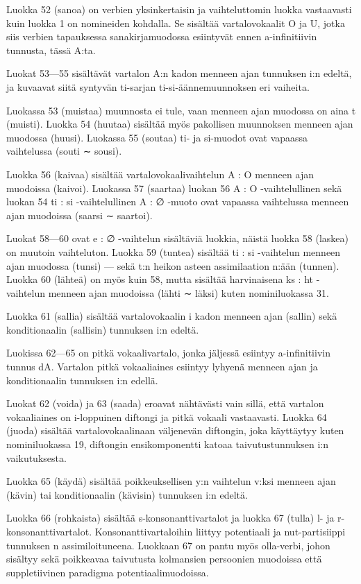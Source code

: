 \documentclass[free]{flammie}
\begin{document}
Luokka 52 (sanoa) on verbien yksinkertaisin ja vaihteluttomin luokka vastaavasti
kuin luokka 1 on nomineiden kohdalla. Se sisältää vartalovokaalit O ja U, jotka
siis verbien tapauksessa sanakirjamuodossa esiintyvät ennen a-infinitiivin tunnusta, tässä A:ta.

Luokat 53—55 sisältävät vartalon A:n kadon menneen ajan tunnuksen i:n edeltä,
ja kuvaavat siitä syntyvän ti-sarjan ti-si-äännemuunnoksen eri vaiheita.

Luokassa 53 (muistaa) muunnosta ei tule, vaan menneen ajan muodossa on aina
t (muisti). Luokka 54 (huutaa) sisältää myös pakollisen muunnoksen menneen
ajan muodossa (huusi). Luokassa 55 (soutaa) ti- ja si-muodot ovat vapaassa vaihtelussa (souti ∼ sousi).

Luokka 56 (kaivaa) sisältää vartalovokaalivaihtelun A : O menneen ajan muodoissa (kaivoi). Luokassa 57 (saartaa) luokan 56 A : O -vaihtelullinen sekä luokan 54 ti : si -vaihtelullinen A : ∅ -muoto ovat vapaassa vaihtelussa menneen ajan
muodoissa (saarsi ∼ saartoi).

Luokat 58—60 ovat e : ∅ -vaihtelun sisältäviä luokkia, näistä luokka 58 (laskea) on muutoin vaihteluton. Luokka 59 (tuntea) sisältää ti : si -vaihtelun menneen ajan muodossa (tunsi) — sekä t:n heikon asteen assimilaation n:ään (tunnen). Luokka 60 (lähteä) on myös kuin 58, mutta sisältää harvinaisena ks : ht
-vaihtelun menneen ajan muodoissa (lähti ∼ läksi) kuten nominiluokassa 31.

Luokka 61 (sallia) sisältää vartalovokaalin i kadon menneen ajan (sallin) sekä
konditionaalin (sallisin) tunnuksen i:n edeltä.

Luokissa 62—65 on pitkä vokaalivartalo, jonka jäljessä esiintyy a-infinitiivin tunnus dA. Vartalon pitkä vokaaliaines esiintyy lyhyenä menneen ajan ja konditionaalin tunnuksen i:n edellä.

Luokat 62 (voida) ja 63 (saada) eroavat nähtävästi vain sillä, että vartalon vokaaliaines on i-loppuinen diftongi ja pitkä vokaali vastaavasti. Luokka 64 (juoda) sisältää vartalovokaalinaan väljenevän diftongin, joka käyttäytyy kuten nominiluokassa 19, diftongin ensikomponentti katoaa taivutustunnuksen i:n vaikutuksesta.

Luokka 65 (käydä) sisältää poikkeuksellisen y:n vaihtelun v:ksi menneen ajan
(kävin) tai konditionaalin (kävisin) tunnuksen i:n edeltä.

Luokka 66 (rohkaista) sisältää s-konsonanttivartalot ja luokka 67 (tulla) l- ja
r-konsonanttivartalot. Konsonanttivartaloihin liittyy potentiaali ja nut-partisiippi
tunnuksen n assimiloituneena. Luokkaan 67 on pantu myös olla-verbi, johon sisältyy sekä poikkeavaa taivutusta kolmansien persoonien muodoissa että suppletiivinen paradigma potentiaalimuodoissa.
\end{document}
